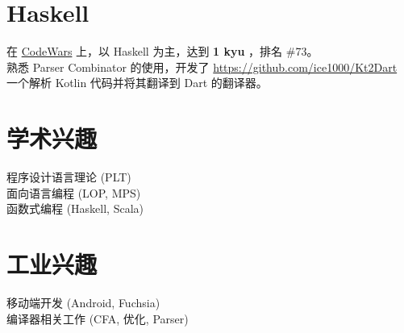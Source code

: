 \documentclass[margin, line]{res}
\begin{document}
\begin{CJK}{UTF8}{gbsn}
\begin{resume}
    \section{\sc Haskell}
    在
    \href{https://www.codewars.com/users/ice1000} {CodeWars}
    上，以 Haskell 为主，达到
    \textbf{1 kyu}
    ，排名 \#73。 \\
    熟悉 Parser Combinator 的使用，开发了
    \url{https://github.com/ice1000/Kt2Dart} \\
    一个解析 Kotlin 代码并将其翻译到 Dart 的翻译器。

    \section{\sc 学术兴趣}
    程序设计语言理论 (PLT) \\
    面向语言编程 (LOP, MPS) \\
    函数式编程 (Haskell, Scala)

    \section{\sc 工业兴趣}
    移动端开发 (Android, Fuchsia) \\
    编译器相关工作 (CFA, 优化, Parser)

    \vspace*{-.2in}

  \end{resume}
\end{CJK}
\end{document}
